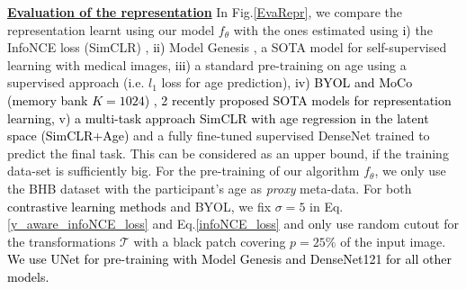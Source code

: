 \documentclass[runningheads]{llncs}
\newcommand{\rebuttal}[1]{\textcolor{black}{#1}}
\newcommand{\ED}[1]{\textcolor{orange}{#1}}
\begin{document}

\justify
\underline{\textbf{Evaluation of the representation}}
In Fig.\ref{EvaRepr}, we compare the representation learnt using our model $f_\theta$ with the ones estimated using \rebuttal{i)} the InfoNCE loss (SimCLR) \cite{chen2020simCLR}, \rebuttal{ii)} Model Genesis \cite{zhou2020genesis}, a SOTA model for self-supervised learning with medical images, \rebuttal{iii)} a standard pre-training on age using a supervised approach (i.e. $l_1$ loss for age prediction), \rebuttal{iv) BYOL \cite{grill2020byol} and MoCo \cite{he2020moco} (memory bank $K=1024$) , 2 recently proposed SOTA models for representation learning, v) a multi-task approach SimCLR with age regression in the latent space (SimCLR+Age)} and a fully fine-tuned supervised DenseNet trained to predict the final task. This can be considered as an upper bound, if the training data-set is sufficiently big.
For the pre-training of our algorithm $f_\theta$, we only use the BHB dataset with the participant's age as \textit{proxy} meta-data. For both \rebuttal{contrastive learning methods} and BYOL, we fix $\sigma=5$ in Eq.\ref{y_aware_infoNCE_loss} and Eq.\ref{infoNCE_loss} and only use random cutout for the transformations $\mathcal{T}$ with a black patch covering $p=25\%$ of the input image. \rebuttal{We use UNet for pre-training with Model Genesis and DenseNet121 for all other models.}
\end{document}
